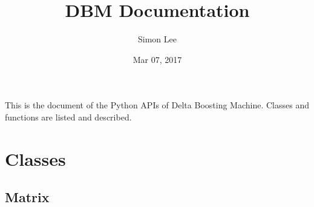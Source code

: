 \documentclass[letterpaper,10pt,english]{sphinxmanual}
\title{DBM Documentation}
\date{Mar 07, 2017}
\author{Simon Lee}
\begin{document}
\maketitle
\sphinxtableofcontents
{}\label{\detokenize{index::doc}}


This is the document of the Python APIs of Delta Boosting Machine. Classes and functions are listed and described.


\chapter{Classes}
\label{\detokenize{index:welcome-to-dbm-s-documentation}}\label{\detokenize{index:classes}}

\section{Matrix}
\label{\detokenize{index:matrix}}
\end{document}
